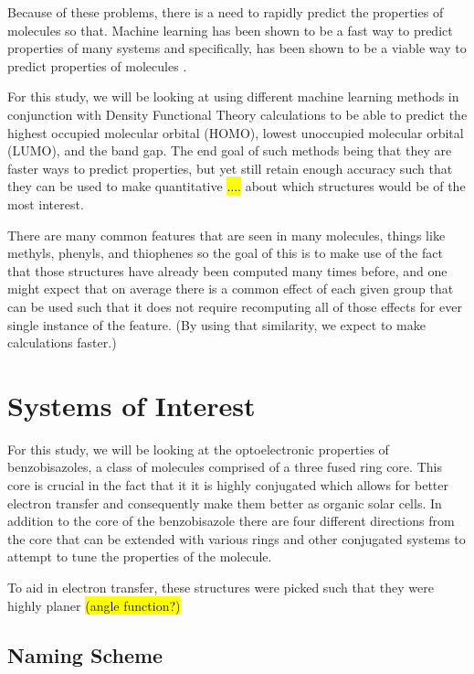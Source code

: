 \documentclass[10pt]{article}
\begin{document}
Because of these problems, there is a need to rapidly predict the properties of molecules so that. Machine learning has been shown to be a fast way to predict properties of many systems and specifically, has been shown to be a viable way to predict properties of molecules\cite{hansen_assessment_2013} \cite{montavon_machine_2013}.

For this study, we will be looking at using different machine learning methods in conjunction with Density Functional Theory calculations to be able to predict the highest occupied molecular orbital (HOMO), lowest unoccupied molecular orbital (LUMO), and the band gap. The end goal of such methods being that they are faster ways to predict properties, but yet still retain enough accuracy such that they can be used to make quantitative \hl{....} about which structures would be of the most interest.

There are many common features that are seen in many molecules, things like methyls, phenyls, and thiophenes so the goal of this is to make use of the fact that those structures have already been computed many times before, and one might expect that on average there is a common effect of each given group that can be used such that it does not require recomputing all of those effects for ever single instance of the feature. (By using that similarity, we expect to make calculations faster.)


\section{Systems of Interest}

For this study, we will be looking at the optoelectronic properties of benzobisazoles, a class of molecules comprised of a three fused ring core. This core is crucial in the fact that it it is highly conjugated which allows for better electron transfer and consequently make them better as organic solar cells. In addition to the core of the benzobisazole there are four different directions from the core that can be extended with various rings and other conjugated systems to attempt to tune the properties of the molecule.

To aid in electron transfer, these structures were picked such that they were highly planer \hl{(angle function?)}

\subsection{Naming Scheme}
\end{document}

